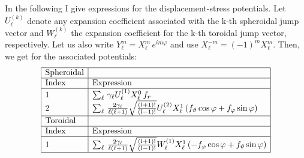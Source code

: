 \documentclass[12pt,a4paper]{article}
\begin{document}
In the following I give expressions for the displacement-stress potentials. Let $U_\ell^{(k)}$ denote any expansion coefficient associated with the k-th spheroidal jump vector and $W_\ell^{(k)}$ the expansion coefficient for the k-th toroidal jump vector, respectively. Let us also write $Y_{\ell}^{m} = X_{\ell}^{m}\,e^{im\varphi}$ and use $X_{\ell}^{-m}= (-1)^m X_{\ell}^{m}$. Then, we get for the associated potentials:
\begin{displaymath}
\begin{array}{|l|l|}\hline
\mbox{Spheroidal} & \\ \hline
\mbox{Index} & \mbox{Expression} \\ \hline
1 & \sum_\ell\,\gamma_\ell U_\ell^{(1)}X_{\ell}^{0}\,f_r \\
2 & \sum_\ell\,\frac{2\gamma_\ell}{\ell(\ell+1)}\sqrt{\frac{(l+1)!}{(l-1)!}} U_\ell^{(2)} X_{\ell}^{1} \left(f_\vartheta\cos\varphi+f_\varphi\sin\varphi\right) \\ \hline
\mbox{Toroidal} & \\ \hline
\mbox{Index} & \mbox{Expression} \\ \hline
1 & \sum_\ell\,\frac{2\gamma_\ell}{\ell(\ell+1)}\sqrt{\frac{(l+1)!}{(l-1)!}} W_\ell^{(1)} X_{\ell}^{1} \left(-f_\varphi\cos\varphi+f_\vartheta\sin\varphi\right) \\ \hline
\end{array}
\end{displaymath}
\end{document}
